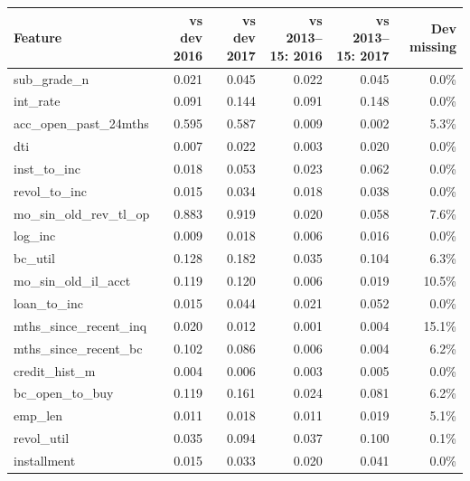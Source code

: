 \begin{tabular}{lrrrrr}
\toprule
Feature & vs dev 2016 & vs dev 2017 & vs 2013--15: 2016 & vs 2013--15: 2017 & Dev missing \\
\midrule
sub\_grade\_n & 0.021 & 0.045 & 0.022 & 0.045 & 0.0\% \\
int\_rate & 0.091 & 0.144 & 0.091 & 0.148 & 0.0\% \\
acc\_open\_past\_24mths & 0.595 & 0.587 & 0.009 & 0.002 & 5.3\% \\
dti & 0.007 & 0.022 & 0.003 & 0.020 & 0.0\% \\
inst\_to\_inc & 0.018 & 0.053 & 0.023 & 0.062 & 0.0\% \\
revol\_to\_inc & 0.015 & 0.034 & 0.018 & 0.038 & 0.0\% \\
mo\_sin\_old\_rev\_tl\_op & 0.883 & 0.919 & 0.020 & 0.058 & 7.6\% \\
log\_inc & 0.009 & 0.018 & 0.006 & 0.016 & 0.0\% \\
bc\_util & 0.128 & 0.182 & 0.035 & 0.104 & 6.3\% \\
mo\_sin\_old\_il\_acct & 0.119 & 0.120 & 0.006 & 0.019 & 10.5\% \\
loan\_to\_inc & 0.015 & 0.044 & 0.021 & 0.052 & 0.0\% \\
mths\_since\_recent\_inq & 0.020 & 0.012 & 0.001 & 0.004 & 15.1\% \\
mths\_since\_recent\_bc & 0.102 & 0.086 & 0.006 & 0.004 & 6.2\% \\
credit\_hist\_m & 0.004 & 0.006 & 0.003 & 0.005 & 0.0\% \\
bc\_open\_to\_buy & 0.119 & 0.161 & 0.024 & 0.081 & 6.2\% \\
emp\_len & 0.011 & 0.018 & 0.011 & 0.019 & 5.1\% \\
revol\_util & 0.035 & 0.094 & 0.037 & 0.100 & 0.1\% \\
installment & 0.015 & 0.033 & 0.020 & 0.041 & 0.0\% \\
\bottomrule
\end{tabular}
